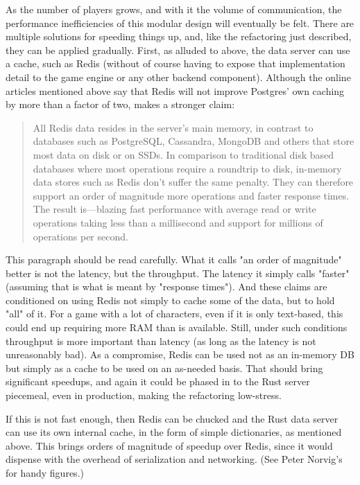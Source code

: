 As the number of players grows, and with it the volume of communication, the
performance inefficiencies of this modular design will eventually be felt.
There are multiple solutions for speeding things up, and, like the refactoring
just described, they can be applied gradually.
First, as alluded to above, the data server can use a cache, such as Redis
(without of course having to expose that implementation detail to the game
engine or any other backend component).
Although the online articles mentioned above say that
Redis will not improve Postgres' own caching by more than a factor of two,
makes a stronger claim:
\begin{quote}
{\small
All Redis data resides in the server's main memory, in contrast to databases
such as PostgreSQL, Cassandra, MongoDB and others that store most data on disk
or on SSDs. In comparison to traditional disk based databases where most
operations require a roundtrip to disk, in-memory data stores such as Redis
don't suffer the same penalty.
They can therefore support an order of
magnitude more operations and faster response times.
The result is---blazing
fast performance with average read or write operations taking less than a
millisecond and support for millions of operations per second.
}
\end{quote}
This paragraph should be read carefully.
What it calls "an order of magnitude" better is not the latency, but the
throughput.
The latency it simply calls "faster" (assuming that is what is meant by
"response times").
And these claims are conditioned on using Redis not simply to cache some of the
data, but to hold "all" of it.
For a game with a lot of characters, even if it
is only text-based, this could end up requiring more RAM than is available.
Still, under such conditions throughput is more important than latency (as
long as the latency is not unreasonably bad).
As a compromise, Redis can be used not as an in-memory DB but simply as a cache
to be used on an as-needed basis.
That should bring significant speedups, and again it
could be phased in to the Rust server piecemeal, even in production, making
the refactoring low-stress.

If this is not fast enough, then Redis can be chucked and the Rust data server
can use its own internal cache, in the form of simple dictionaries,
as mentioned above.
This brings orders of magnitude of speedup over Redis, since it would dispense
with the overhead of serialization and networking. (See Peter Norvig's
for handy figures.)

